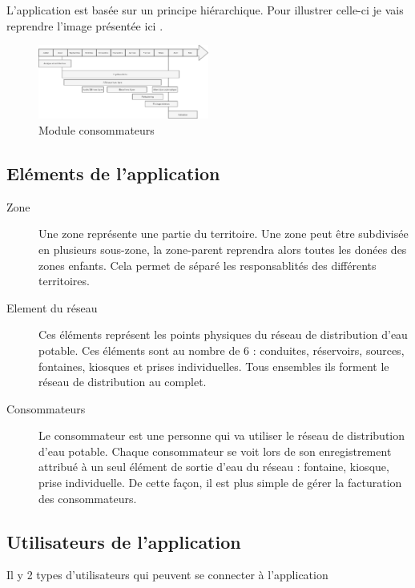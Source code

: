 \documentclass{EPL-master-thesis-covers-FR}
\begin{document}
				L'application est basée sur un principe hiérarchique. Pour illustrer celle-ci je vais reprendre l'image présentée ici \cite{ref:haitiwater}. 
				
				\begin{figure}[H]
					\centering
					\includegraphics[width=0.5\textwidth]{images/Gantt}
					\caption{Module consommateurs}
				\end{figure}
				
				
			\subsection{Eléments de l'application}
				\begin{description}
					\item[Zone] Une zone représente une partie du territoire. Une zone peut être subdivisée en plusieurs sous-zone, la zone-parent reprendra alors toutes les donées des zones enfants. Cela permet de séparé les responsablités des différents territoires.
					\item[Element du réseau] Ces éléments représent les points physiques du réseau de distribution d'eau potable. Ces éléments sont au nombre de 6 : conduites, réservoirs, sources, fontaines, kiosques et prises individuelles. Tous ensembles ils forment le réseau de distribution au complet. 
					\item[Consommateurs] Le consommateur est une personne qui va utiliser le réseau de distribution d'eau potable. Chaque consommateur se voit lors de son enregistrement attribué à un seul élément de sortie d'eau du réseau : fontaine, kiosque, prise individuelle. De cette façon, il est plus simple de gérer la facturation des consommateurs.
				\end{description}
				
			
				
				
			\subsection{Utilisateurs de l'application}
				Il y 2 types d'utilisateurs qui peuvent se connecter à l'application
				
\end{document}
